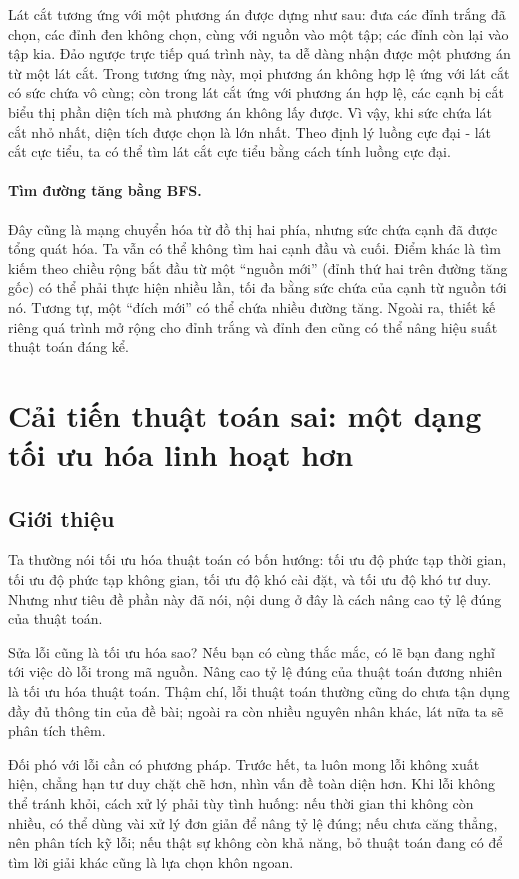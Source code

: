 \documentclass[11pt]{article}
\begin{document}
Lát cắt tương ứng với một phương án được dựng như sau: đưa các đỉnh trắng đã
chọn, các đỉnh đen không chọn, cùng với nguồn vào một tập; các đỉnh còn lại
vào tập kia. Đảo ngược trực tiếp quá trình này, ta dễ dàng nhận được một
phương án từ một lát cắt. Trong tương ứng này, mọi phương án không hợp lệ ứng
với lát cắt có sức chứa vô cùng; còn trong lát cắt ứng với phương án hợp lệ,
các cạnh bị cắt biểu thị phần diện tích mà phương án không lấy được. Vì vậy,
khi sức chứa lát cắt nhỏ nhất, diện tích được chọn là lớn nhất. Theo định lý
luồng cực đại - lát cắt cực tiểu, ta có thể tìm lát cắt cực tiểu bằng cách
tính luồng cực đại.

\paragraph{Tìm đường tăng bằng BFS.}
Đây cũng là mạng chuyển hóa từ đồ thị hai phía, nhưng sức chứa cạnh đã được
tổng quát hóa. Ta vẫn có thể không tìm hai cạnh đầu và cuối. Điểm khác là
tìm kiếm theo chiều rộng bắt đầu từ một ``nguồn mới'' (đỉnh thứ hai trên
đường tăng gốc) có thể phải thực hiện nhiều lần, tối đa bằng sức chứa của
cạnh từ nguồn tới nó. Tương tự, một ``đích mới'' có thể chứa nhiều đường tăng.
Ngoài ra, thiết kế riêng quá trình mở rộng cho đỉnh trắng và đỉnh đen cũng có
thể nâng hiệu suất thuật toán đáng kể.

\section{Cải tiến thuật toán sai: một dạng tối ưu hóa linh hoạt hơn}

\subsection{Giới thiệu}

Ta thường nói tối ưu hóa thuật toán có bốn hướng: tối ưu độ phức tạp thời
gian, tối ưu độ phức tạp không gian, tối ưu độ khó cài đặt, và tối ưu độ khó
tư duy. Nhưng như tiêu đề phần này đã nói, nội dung ở đây là cách nâng cao tỷ
lệ đúng của thuật toán.

Sửa lỗi cũng là tối ưu hóa sao? Nếu bạn có cùng thắc mắc, có lẽ bạn đang nghĩ
tới việc dò lỗi trong mã nguồn. Nâng cao tỷ lệ đúng của thuật toán đương nhiên
là tối ưu hóa thuật toán. Thậm chí, lỗi thuật toán thường cũng do chưa tận
dụng đầy đủ thông tin của đề bài; ngoài ra còn nhiều nguyên nhân khác, lát nữa
ta sẽ phân tích thêm.

Đối phó với lỗi cần có phương pháp. Trước hết, ta luôn mong lỗi không xuất
hiện, chẳng hạn tư duy chặt chẽ hơn, nhìn vấn đề toàn diện hơn. Khi lỗi không
thể tránh khỏi, cách xử lý phải tùy tình huống: nếu thời gian thi không còn
nhiều, có thể dùng vài xử lý đơn giản để nâng tỷ lệ đúng; nếu chưa căng thẳng,
nên phân tích kỹ lỗi; nếu thật sự không còn khả năng, bỏ thuật toán đang có
để tìm lời giải khác cũng là lựa chọn khôn ngoan.
\end{document}

